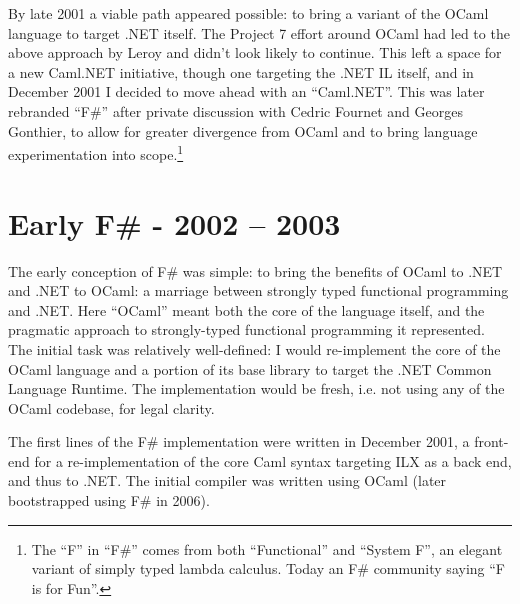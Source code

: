 \documentclass[acmsmall]{acmart}\settopmatter{}
\begin{document}
By late 2001 a viable path appeared possible: to bring a variant of the OCaml language to target .NET itself. The Project 7 effort around OCaml had led to the above approach by Leroy and didn’t look likely to continue.  This left a space for a new Caml.NET initiative, though one targeting the .NET IL itself, and in December 2001 I decided to move ahead with an “Caml.NET”. This was later rebranded “F\#” after private discussion with Cedric Fournet and Georges Gonthier, to allow for greater divergence from OCaml and to bring language experimentation into scope.\footnote{The “F” in “F\#” comes from both “Functional” and “System F”, an elegant variant of simply typed lambda calculus. Today an F\# community saying “F is for Fun”.}


\section*{Early F\# - 2002 – 2003}

The early conception of F\# was simple: to bring the benefits of OCaml to .NET and .NET to OCaml: a marriage between strongly typed functional programming and .NET.  Here “OCaml” meant both the core of the language itself, and the pragmatic approach to strongly-typed functional programming it represented. The initial task was relatively well-defined: I would re-implement the core of the OCaml language and a portion of its base library to target the .NET Common Language Runtime. The implementation would be fresh, i.e. not using any of the OCaml codebase, for legal clarity. 

The first lines of the F\# implementation were written in December 2001, a front-end for a re-implementation of the core Caml syntax targeting ILX as a back end, and thus to .NET. The initial compiler was written using OCaml (later bootstrapped using F\# in 2006). 
\end{document}
